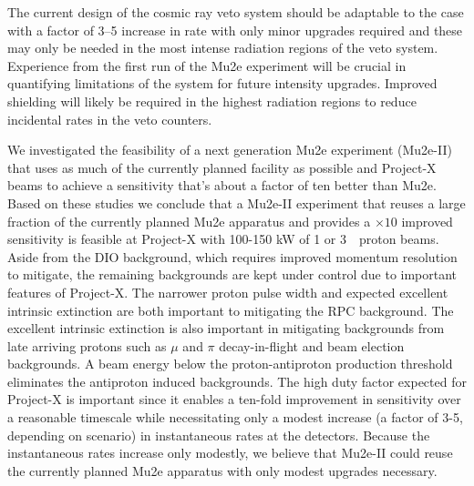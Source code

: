 The current design of the cosmic ray veto system should be adaptable
to the case with a factor of 3--5 increase in rate with only minor
upgrades required and these may only be needed in the most intense
radiation regions of the veto system.  Experience from the first run
of the Mu2e experiment will be crucial in quantifying limitations of
the system for future intensity upgrades.  Improved shielding will
likely be required in the highest radiation regions to reduce
incidental rates in the veto counters.



%


We investigated the feasibility of a next generation Mu2e experiment
(Mu2e-II) that uses as much of the currently planned facility as
possible and Project-X beams to achieve a sensitivity that's about a
factor of ten better than Mu2e.  Based on these studies we conclude
that a Mu2e-II experiment that reuses a large fraction of the
currently planned Mu2e apparatus and provides a $\times 10$ improved
sensitivity is feasible at Project-X with 100-150 kW of 1 or 3~\gev\
proton beams.  Aside from the DIO background, which requires improved
momentum resolution to mitigate, the remaining backgrounds are kept
under control due to important features of Project-X.  The narrower
proton pulse width and expected excellent intrinsic extinction are
both important to mitigating the RPC background.  The excellent
intrinsic extinction is also important in mitigating backgrounds from
late arriving protons such as $\mu$ and $\pi$ decay-in-flight and beam
election backgrounds.  A beam energy below the proton-antiproton production
threshold eliminates the antiproton induced backgrounds.  The high
duty factor expected for Project-X is important since it enables a
ten-fold improvement in sensitivity over a reasonable timescale while
necessitating only a modest increase (a factor of 3-5, depending on
scenario) in instantaneous rates at the detectors.  Because the
instantaneous rates increase only modestly, we believe that Mu2e-II
could reuse the currently planned Mu2e apparatus with only modest
upgrades necessary.
